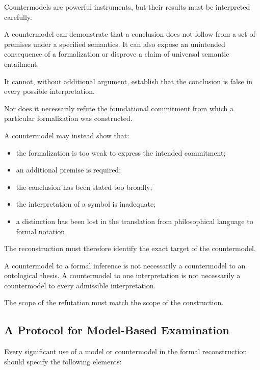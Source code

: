 Countermodels are powerful instruments, but their
results must be interpreted carefully.

A countermodel can demonstrate that a conclusion
does not follow from a set of premises under a
specified semantics. It can also expose an unintended
consequence of a formalization or disprove a claim
of universal semantic entailment.

It cannot, without additional argument, establish
that the conclusion is false in every possible
interpretation.

Nor does it necessarily refute the foundational
commitment from which a particular formalization
was constructed.

A countermodel may instead show that:

\begin{itemize}
    \item the formalization is too weak to express
    the intended commitment;

    \item an additional premise is required;

    \item the conclusion has been stated too broadly;

    \item the interpretation of a symbol is inadequate;

    \item a distinction has been lost in the translation
    from philosophical language to formal notation.
\end{itemize}

The reconstruction must therefore identify the exact
target of the countermodel.

A countermodel to a formal inference is not necessarily
a countermodel to an ontological thesis. A countermodel
to one interpretation is not necessarily a
countermodel to every admissible interpretation.

The scope of the refutation must match the scope
of the construction.

\subsection{A Protocol for Model-Based Examination}

Every significant use of a model or countermodel
in the formal reconstruction should specify the
following elements:

